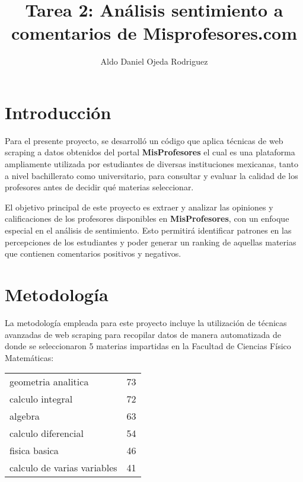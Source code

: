 \documentclass[a4paper,12pt]{article}
\title{Tarea 2:  Análisis sentimiento a comentarios de Misprofesores.com}
\author{Aldo Daniel Ojeda Rodriguez}
\begin{document}
\maketitle

\begin{abstract}
\end{abstract}

\section{Introducción}

Para el presente proyecto, se desarrolló un código que aplica técnicas de web scraping a datos obtenidos del portal \textbf{MisProfesores} el cual es una plataforma ampliamente utilizada por estudiantes de diversas instituciones mexicanas, tanto a nivel bachillerato como universitario, para consultar y evaluar la calidad de los profesores antes de decidir qué materias seleccionar.

El objetivo principal de este proyecto es extraer y analizar las opiniones y calificaciones de los profesores disponibles en \textbf{MisProfesores}, con un enfoque especial en el análisis de sentimiento. Esto permitirá identificar patrones en las percepciones de los estudiantes y poder generar un ranking de aquellas materias que contienen comentarios positivos y negativos.

\section{Metodología}

La metodología empleada para este proyecto incluye la utilización de técnicas avanzadas de web scraping para recopilar datos de manera automatizada de donde se seleccionaron 5 materias impartidas en la Facultad de Ciencias Físico Matemáticas: 
\begin{center}
 \begin{tabular}{lr}
geometria analitica & 73 \\
calculo integral & 72 \\
algebra & 63 \\
calculo diferencial & 54 \\
fisica basica & 46 \\
calculo de varias variables & 41 \\
\end{tabular}
\end{center}
\end{document}
